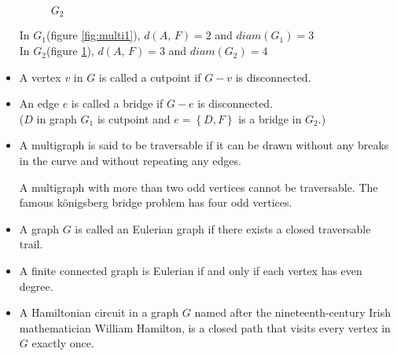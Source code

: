 \documentclass[12pt,oneside,a4paper]{book}
\theoremstyle{remark}
\theoremstyle{definition}
\newcommand{\set}[1]{\left\{#1\right\}}
\begin{document}
\begin{itemize}
\begin{figure}[H]
\begin{minipage}[b]{.5\textwidth}
            \caption{$ G_2 $}
            \label{fig:multi2}
        \end{minipage}
    \end{figure}
    In $ G_1 $(figure \ref{fig:multi1}), $ d(A,\,F)=2 $ and $ diam(G_1)=3 $\\
    In $ G_2 $(figure \ref{fig:multi2}), $ d(A,\,F)=3 $ and $ diam(G_2)=4 $
    \item A vertex $ v $ in $ G $ is called a cutpoint if $ G-v $ is disconnected.
    \item An edge $ e $ is called a bridge if $ G-e $ is disconnected.\\($ D $ in graph $ G_1 $ is cutpoint and $ e=\set{D,F} $ is a bridge in $ G_2 $.)
    \item  A multigraph is said to be traversable if it can be drawn without any breaks in the curve and without repeating any edges.\\
    \begin{center}
        \quad
    \end{center}
    A multigraph with more than two odd vertices cannot be traversable. The famous k\"onigsberg bridge problem has four odd vertices.
    \item A graph $ G $ is called an Eulerian graph if there exists a closed traversable trail.
    \item A finite connected graph is Eulerian if and only if each vertex has even degree.
    \item A Hamiltonian circuit in a graph $ G $ named after the nineteenth-century Irish mathematician William Hamilton, is a closed path that visits every vertex in $ G $ exactly once.


\end{itemize}
\end{document}
